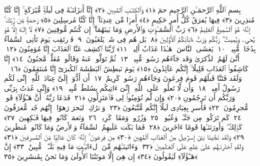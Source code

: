 
  
    
  
    
    

\nopagebreak
  بِسمِ ٱللَّهِ ٱلرَّحمَـٰنِ ٱلرَّحِيمِ
  حمٓ ﴿١﴾
 وَٱلكِتَـٰبِ ٱلمُبِينِ ﴿٢﴾
 إِنَّآ أَنزَلنَـٰهُ فِى لَيلَةٍۢ مُّبَٰرَكَةٍ ۚ إِنَّا كُنَّا مُنذِرِينَ ﴿٣﴾
 فِيهَا يُفرَقُ كُلُّ أَمرٍ حَكِيمٍ ﴿٤﴾
 أَمرًۭا مِّن عِندِنَآ ۚ إِنَّا كُنَّا مُرسِلِينَ ﴿٥﴾
 رَحمَةًۭ مِّن رَّبِّكَ ۚ إِنَّهُۥ هُوَ ٱلسَّمِيعُ ٱلعَلِيمُ ﴿٦﴾
 رَبِّ ٱلسَّمَـٰوَٟتِ وَٱلأَرضِ وَمَا بَينَهُمَآ ۖ إِن كُنتُم مُّوقِنِينَ ﴿٧﴾
 لَآ إِلَـٰهَ إِلَّا هُوَ يُحىِۦ وَيُمِيتُ ۖ رَبُّكُم وَرَبُّ ءَابَآئِكُمُ ٱلأَوَّلِينَ ﴿٨﴾
 بَل هُم فِى شَكٍّۢ يَلعَبُونَ ﴿٩﴾
 فَٱرتَقِب يَومَ تَأتِى ٱلسَّمَآءُ بِدُخَانٍۢ مُّبِينٍۢ ﴿١٠﴾
 يَغشَى ٱلنَّاسَ ۖ هَـٰذَا عَذَابٌ أَلِيمٌۭ ﴿١١﴾
 رَّبَّنَا ٱكشِف عَنَّا ٱلعَذَابَ إِنَّا مُؤمِنُونَ ﴿١٢﴾
 أَنَّىٰ لَهُمُ ٱلذِّكرَىٰ وَقَد جَآءَهُم رَسُولٌۭ مُّبِينٌۭ ﴿١٣﴾
 ثُمَّ تَوَلَّوا۟ عَنهُ وَقَالُوا۟ مُعَلَّمٌۭ مَّجنُونٌ ﴿١٤﴾
 إِنَّا كَاشِفُوا۟ ٱلعَذَابِ قَلِيلًا ۚ إِنَّكُم عَآئِدُونَ ﴿١٥﴾
 يَومَ نَبطِشُ ٱلبَطشَةَ ٱلكُبرَىٰٓ إِنَّا مُنتَقِمُونَ ﴿١٦﴾
 ۞ وَلَقَد فَتَنَّا قَبلَهُم قَومَ فِرعَونَ وَجَآءَهُم رَسُولٌۭ كَرِيمٌ ﴿١٧﴾
 أَن أَدُّوٓا۟ إِلَىَّ عِبَادَ ٱللَّهِ ۖ إِنِّى لَكُم رَسُولٌ أَمِينٌۭ ﴿١٨﴾
 وَأَن لَّا تَعلُوا۟ عَلَى ٱللَّهِ ۖ إِنِّىٓ ءَاتِيكُم بِسُلطَٰنٍۢ مُّبِينٍۢ ﴿١٩﴾
 وَإِنِّى عُذتُ بِرَبِّى وَرَبِّكُم أَن تَرجُمُونِ ﴿٢٠﴾
 وَإِن لَّم تُؤمِنُوا۟ لِى فَٱعتَزِلُونِ ﴿٢١﴾
 فَدَعَا رَبَّهُۥٓ أَنَّ هَـٰٓؤُلَآءِ قَومٌۭ مُّجرِمُونَ ﴿٢٢﴾
 فَأَسرِ بِعِبَادِى لَيلًا إِنَّكُم مُّتَّبَعُونَ ﴿٢٣﴾
 وَٱترُكِ ٱلبَحرَ رَهوًا ۖ إِنَّهُم جُندٌۭ مُّغرَقُونَ ﴿٢٤﴾
 كَم تَرَكُوا۟ مِن جَنَّـٰتٍۢ وَعُيُونٍۢ ﴿٢٥﴾
 وَزُرُوعٍۢ وَمَقَامٍۢ كَرِيمٍۢ ﴿٢٦﴾
 وَنَعمَةٍۢ كَانُوا۟ فِيهَا فَـٰكِهِينَ ﴿٢٧﴾
 كَذَٟلِكَ ۖ وَأَورَثنَـٰهَا قَومًا ءَاخَرِينَ ﴿٢٨﴾
 فَمَا بَكَت عَلَيهِمُ ٱلسَّمَآءُ وَٱلأَرضُ وَمَا كَانُوا۟ مُنظَرِينَ ﴿٢٩﴾
 وَلَقَد نَجَّينَا بَنِىٓ إِسرَٰٓءِيلَ مِنَ ٱلعَذَابِ ٱلمُهِينِ ﴿٣٠﴾
 مِن فِرعَونَ ۚ إِنَّهُۥ كَانَ عَالِيًۭا مِّنَ ٱلمُسرِفِينَ ﴿٣١﴾
 وَلَقَدِ ٱختَرنَـٰهُم عَلَىٰ عِلمٍ عَلَى ٱلعَـٰلَمِينَ ﴿٣٢﴾
 وَءَاتَينَـٰهُم مِّنَ ٱلءَايَـٰتِ مَا فِيهِ بَلَـٰٓؤٌۭا۟ مُّبِينٌ ﴿٣٣﴾
 إِنَّ هَـٰٓؤُلَآءِ لَيَقُولُونَ ﴿٣٤﴾
 إِن هِىَ إِلَّا مَوتَتُنَا ٱلأُولَىٰ وَمَا نَحنُ بِمُنشَرِينَ ﴿٣٥﴾
